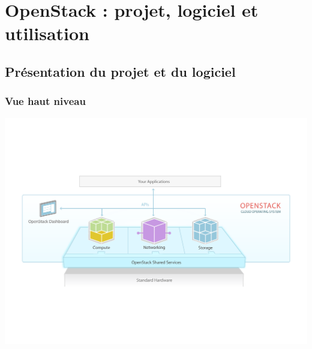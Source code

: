   \section[OpenStack]{OpenStack : projet, logiciel et utilisation}

  \subsection[OpenStack]{Présentation du projet et du logiciel}

  \begin{frame}
    \frametitle{Vue haut niveau}
    \includegraphics[width=\textwidth]{images/openstack-software-diagram.pdf}
  \end{frame}

